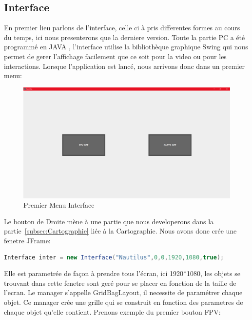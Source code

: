 \documentclass[a4paper,11pt]{report}
\begin{document}
		\subsection{Interface}
			En premier lieu parlons de l'interface, celle ci à pris differentes formes au cours du temps, ici nous presenterons que la derniere version. Toute la partie PC a été programmé en JAVA \cite{ref4}, l'interface utilise la bibliothèque graphique Swing qui nous permet de gerer l'affichage facilement que ce soit pour la video ou pour les interactions.
			Lorsque l'application est lancé, nous arrivons donc dans un premier menu:
			\begin{figure}[!h]
					\begin{center}
						\includegraphics[scale=0.35]{Photos/Interface1.png}
						\caption{Premier Menu Interface}
					\end{center}
				\end{figure}
				\newline Le bouton de Droite mène à une partie que nous developerons dans la partie~\ref{subsec:Cartographie} liée à la Cartographie.
				\newline \newline Nous avons donc crée une fenetre JFrame:
				\begin{lstlisting}[language=java]
Interface inter = new Interface("Nautilus",0,0,1920,1080,true);
				\end{lstlisting}
				Elle est parametrée de façon à prendre tous l'écran, ici 1920*1080, les objets se trouvant dans cette fenetre sont geré pour se placer en fonction de la taille de l'ecran.
				\newline Le manager s'appelle GridBagLayout, il necessite de paramétrer chaque objet.
				Ce manager crée une grille qui se construit en fonction des parametres de chaque objet qu'elle contient.
				\newpage Prenons exemple du premier bouton FPV:
\end{document}
